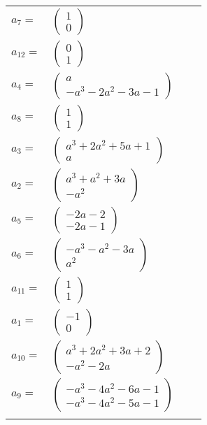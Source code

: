 \documentclass[1p]{elsarticle_modified}
\theoremstyle{definition}
\begin{document}
\begin{tabular}{m{7pt} m{180pt} m{7pt} m{180pt} }
\flushright $a_{7}=$&$\begin{pmatrix}1\\0\end{pmatrix}$ \\
\flushright $a_{12}=$&$\begin{pmatrix}0\\1\end{pmatrix}$ \\
\flushright $a_{4}=$&$\begin{pmatrix}a\\- a^3-2 a^2-3 a-1\end{pmatrix}$ \\
\flushright $a_{8}=$&$\begin{pmatrix}1\\1\end{pmatrix}$ \\
\flushright $a_{3}=$&$\begin{pmatrix}a^3+2 a^2+5 a+1\\a\end{pmatrix}$ \\
\flushright $a_{2}=$&$\begin{pmatrix}a^3+a^2+3 a\\- a^2\end{pmatrix}$ \\
\flushright $a_{5}=$&$\begin{pmatrix}-2 a-2\\-2 a-1\end{pmatrix}$ \\
\flushright $a_{6}=$&$\begin{pmatrix}- a^3- a^2-3 a\\a^2\end{pmatrix}$ \\
\flushright $a_{11}=$&$\begin{pmatrix}1\\1\end{pmatrix}$ \\
\flushright $a_{1}=$&$\begin{pmatrix}-1\\0\end{pmatrix}$ \\
\flushright $a_{10}=$&$\begin{pmatrix}a^3+2 a^2+3 a+2\\- a^2-2 a\end{pmatrix}$ \\
\flushright $a_{9}=$&$\begin{pmatrix}- a^3-4 a^2-6 a-1\\- a^3-4 a^2-5 a-1\end{pmatrix}$\\&\end{tabular}
\end{document}
